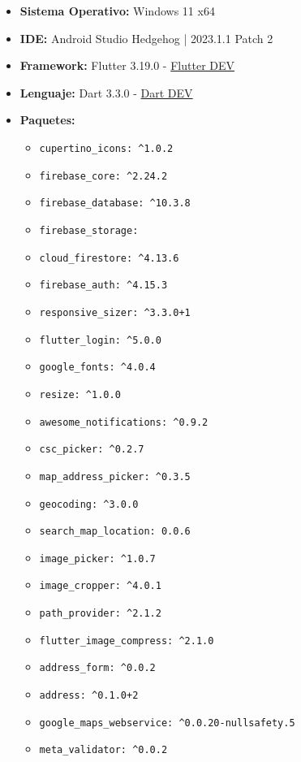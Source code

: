 \documentclass[a4paper, 12pt]{article}
\begin{document}
\begin{itemize}
	\item \textbf{Sistema Operativo:} Windows 11 x64
	\item \textbf{IDE:} Android Studio Hedgehog | 2023.1.1 Patch 2
	\item \textbf{Framework:} Flutter 3.19.0 -  \href{https://flutter.dev/6}{Flutter DEV}
	\item \textbf{Lenguaje:} Dart 3.3.0 - \href{https://dart.dev/}{Dart DEV}
	\item \textbf{Paquetes:}
		\begin{itemize}
		  \item \texttt{cupertino\_icons: \^{}1.0.2}
		  \item \texttt{firebase\_core: \^{}2.24.2}
		  \item \texttt{firebase\_database: \^{}10.3.8}
		  \item \texttt{firebase\_storage:}
		  \item \texttt{cloud\_firestore: \^{}4.13.6}
		  \item \texttt{firebase\_auth: \^{}4.15.3}
		  \item \texttt{responsive\_sizer: \^{}3.3.0+1}
		  \item \texttt{flutter\_login: \^{}5.0.0}
		  \item \texttt{google\_fonts: \^{}4.0.4}
		  \item \texttt{resize: \^{}1.0.0}
		  \item \texttt{awesome\_notifications: \^{}0.9.2}
		  \item \texttt{csc\_picker: \^{}0.2.7}
		  \item \texttt{map\_address\_picker: \^{}0.3.5}
		  \item \texttt{geocoding: \^{}3.0.0}
		  \item \texttt{search\_map\_location: 0.0.6}
		  \item \texttt{image\_picker: \^{}1.0.7}
		  \item \texttt{image\_cropper: \^{}4.0.1}
		  \item \texttt{path\_provider: \^{}2.1.2}
		  \item \texttt{flutter\_image\_compress: \^{}2.1.0}
		  \item \texttt{address\_form: \^{}0.0.2}
		  \item \texttt{address: \^{}0.1.0+2}
		  \item \texttt{google\_maps\_webservice: \^{}0.0.20-nullsafety.5}
		  \item \texttt{meta\_validator: \^{}0.0.2}

\end{itemize}
\end{itemize}
\end{document}
